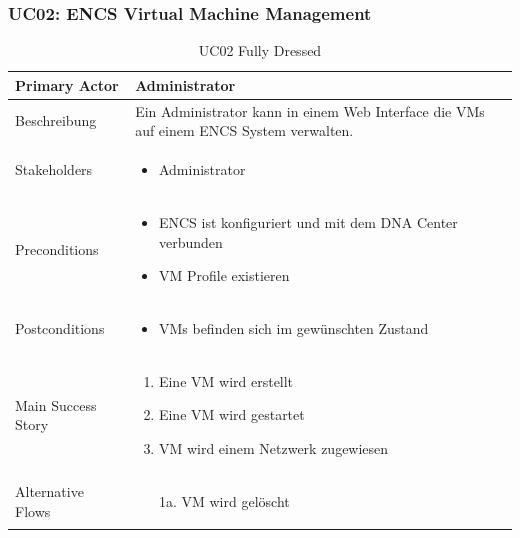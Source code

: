 \subsubsection{UC02: ENCS Virtual Machine Management}
\begin{table}[H]
	\centering
	\begin{tabularx}{\textwidth}{l | X}
		Primary Actor      & Administrator        \\
		\hline
		Beschreibung       & Ein Administrator kann in einem Web Interface die VMs auf einem ENCS System verwalten. \\ 
		\hline
		Stakeholders       &  
		\begin{itemize}	
			\item Administrator
		\end{itemize}              \\
		\hline
		Preconditions      & 
		\begin{itemize}	
			\item ENCS ist konfiguriert und mit dem DNA Center verbunden
			\item VM Profile existieren
		\end{itemize}  \\
		\hline
		Postconditions     & 
		\begin{itemize}	
			\item VMs befinden sich im gewünschten Zustand
		\end{itemize}  \\
		\hline
		Main Success Story & 
		\begin{enumerate}
			\item Eine VM wird erstellt
			\item Eine VM wird gestartet
			\item VM wird einem Netzwerk zugewiesen
		\end{enumerate}
		\\
		\hline
		Alternative Flows  & 
		\begin{itemize}
			\item[1a.] VM wird gelöscht
		\end{itemize}
	\end{tabularx}
	\caption{UC02 Fully Dressed}
	\label{tab:UC02}
\end{table}


